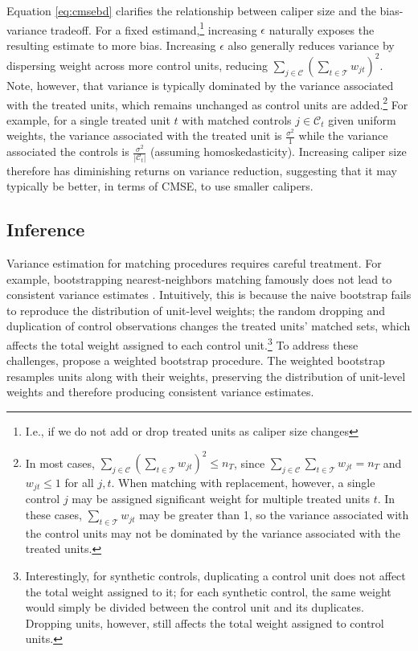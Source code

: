 \documentclass{article}
\newcommand{\Ct}{\mathcal{C}_{t}}
\begin{document}
Equation \ref{eq:cmsebd} clarifies the relationship between caliper size and the bias-variance tradeoff.
For a fixed estimand,\footnote{I.e., if we do not add or drop treated units as caliper size changes} increasing $\epsilon$ naturally exposes the resulting estimate to more bias.
Increasing $\epsilon$ also generally reduces variance by dispersing weight across more control units, reducing $\sum_{j \in \mathcal{C}} (\sum_{t \in \mathcal{T}} w_{jt})^2$.
Note, however, that variance is typically dominated by the variance associated with the treated units, which remains unchanged as control units are added.\footnote{In most cases, $\sum_{j \in \mathcal{C}} (\sum_{t \in \mathcal{T}} w_{jt})^2 \leq n_T$, since $\sum_{j \in \mathcal{C}} \sum_{t \in \mathcal{T}} w_{jt} = n_T$ and $w_{jt} \leq 1$ for all $j, t$.
When matching with replacement, however, a single control $j$ may be assigned significant weight for multiple treated units $t$.
In these cases, $\sum_{t \in \mathcal{T}} w_{jt}$ may be greater than 1, so the variance associated with the control units may not be dominated by the variance associated with the treated units.}
For example, for a single treated unit $t$ with matched controls $j \in \Ct$ given uniform weights, the variance associated with the treated unit is
$\frac{\sigma^2}{1}$ while the variance associated the controls is $\frac{\sigma^2}{|\Ct|}$ (assuming homoskedasticity).
Increasing caliper size therefore has diminishing returns on variance reduction, suggesting that it may typically be better, in terms of CMSE, to use smaller calipers.


\subsection{Inference}


Variance estimation for matching procedures requires careful treatment.
For example, bootstrapping nearest-neighbors matching famously does not lead to consistent variance estimates \citep{abadie2008failure}.
Intuitively, this is because the naive bootstrap fails to reproduce the distribution of unit-level weights;
the random dropping and duplication of control observations changes the treated units' matched sets, which affects the total weight assigned to each control unit.\footnote{Interestingly, for synthetic controls, duplicating a control unit does not affect the total weight assigned to it; for each synthetic control, the same weight would simply be divided between the control unit and its duplicates. Dropping units, however, still affects the total weight assigned to control units.}
To address these challenges, \citet{otsu2017bootstrap} propose a weighted bootstrap procedure.
The weighted bootstrap resamples units along with their weights, preserving the distribution of unit-level weights and therefore producing consistent variance estimates.
\end{document}
